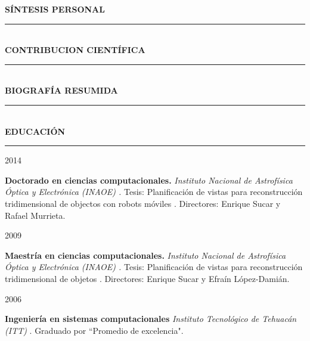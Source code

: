 \documentclass[10pt]{article}
\begin{document}
{\bf SÍNTESIS PERSONAL}
\vspace{3pt}
\hrule

 \\

{\bf CONTRIBUCION CIENTÍFICA} 
\vspace{3pt}
\hrule

 \\

{\bf BIOGRAFÍA RESUMIDA}
\vspace{3pt}
\hrule

 \\
	
{\bf EDUCACIÓN}
\vspace{3pt}
\hrule

\begin{minipage}{1.5 in}
	2014\\
\end{minipage}
\begin{minipage}{4.5in}
	\textbf{Doctorado en ciencias computacionales.} \textit{Instituto Nacional de Astrofísica Óptica y Electrónica (INAOE) \href{https://www.inaoep.mx/}{\faExternalLink}.} Tesis: Planificación de vistas para reconstrucción tridimensional de objectos con robots móviles \href{https://jivasquez.files.wordpress.com/2015/03/tesis-doctorado.pdf}{\faFilePdfO}. Directores: Enrique Sucar y Rafael Murrieta.\\ 
\end{minipage}

\begin{minipage}{1.5 in}
	2009\\
\end{minipage}
\begin{minipage}{4.5in}
	\textbf{Maestría en ciencias computacionales.} \textit{Instituto Nacional de Astrofísica Óptica y Electrónica (INAOE) \href{https://www.inaoep.mx/}{\faExternalLink}.} Tesis: Planificación de vistas para reconstrucción tridimensional de objetos \href{https://jivasquez.files.wordpress.com/2015/03/tesis-maestria.pdf}{\faFilePdfO}. Directores: Enrique Sucar y Efraín López-Damián.\\ 
\end{minipage}

\begin{minipage}{1.5 in}
	2006\\
\end{minipage}
\begin{minipage}{4.5in}
	\textbf{Ingeniería en sistemas computacionales} \textit{Instituto Tecnológico de Tehuacán (ITT)} \href{http://www.ittehuacan.edu.mx/}{\faExternalLink}. Graduado por ``Promedio de excelencia".\\ 
\end{minipage} 
\end{document}
